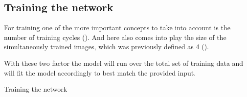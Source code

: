 \subsection{Training the network}

For training one of the more important concepts to take into account is the number of training cycles (). And here also comes into play the size of the simultaneously trained images, which was previously defined as 4 ().

With these two factor the model will run over the total set of training data and will fit the model accordingly to best match the provided input.

\begin{code}
        
    
    \caption{Training the network} 
    
\end{code}    



